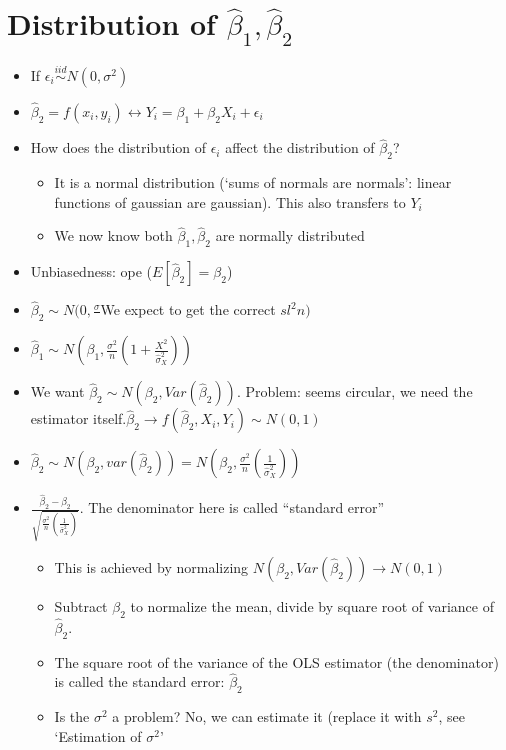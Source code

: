 \documentclass[10pt, oneside]{article}
\begin{document}
\section{Distribution of $\hat \beta_1, \hat \beta_2$}
\begin{itemize}
    \item If $\epsilon_i \overset{iid}{\sim} N (0, \sigma^2)$
    \item $\hat \beta_ 2 = f(x_i, y_i) \leftrightarrow Y_i = \beta_1 + \beta_2X_i + \epsilon_i$
    \item How does the distribution of $\epsilon_i$ affect the distribution of $\hat \beta_2$?
    \begin{itemize}
        \item It is a normal distribution (`sums of normals are normals': linear functions of gaussian are gaussian). This also transfers to $Y_i$
        \item We now know both $\hat \beta_1,\hat \beta_2$ are normally distributed
    \end{itemize}
    \item Unbiasedness: ope ($E[\hat \beta_2 ] = \beta_2$)
    \item $\hat \beta_2 \sim N(0, \frac{\sigma}{}$We expect to get the correct $sl^2{n})$
    \item $\hat \beta_1 \sim N(\beta_1, \frac{\sigma^2}{n}(1 + \frac{X^2}{\hat \sigma ^2 _X}))$
    \item We want $\hat \beta_2 \sim N(\beta_2, Var(\hat \beta_2))$. Problem: seems circular, we need the estimator itself.$\hat \beta_2 \rightarrow f(\hat \beta_2, X_i, Y_i ) \sim N(0,1)$
    \item $\hat \beta_2 \sim N(\beta_2, var(\hat \beta_2)) = N(\beta_2, \frac{\sigma^2}{n} (\frac{1}{\hat \sigma^2 _X}))$
    \item $\frac{\hat \beta_2 - \beta_2}{\sqrt{\frac{\sigma^2}{n} (\frac{1}{\hat \sigma^2_X})}}$. The denominator here is called ``standard error''
    \begin{itemize}
        \item This is achieved by normalizing $N(\beta_2, Var(\hat \beta_2)) \rightarrow N(0,1)$
        \item Subtract $\beta_2$ to normalize the mean, divide by square root of variance of $\hat \beta_2$. 
        \item The square root of the variance of the OLS estimator (the denominator) is called the standard error: $\hat \beta_2$
        \item Is the $\sigma^2$ a problem? No, we can estimate it (replace it with $s^2$, see `Estimation of $\sigma^2$'

\end{itemize}
\end{itemize}
\end{document}

